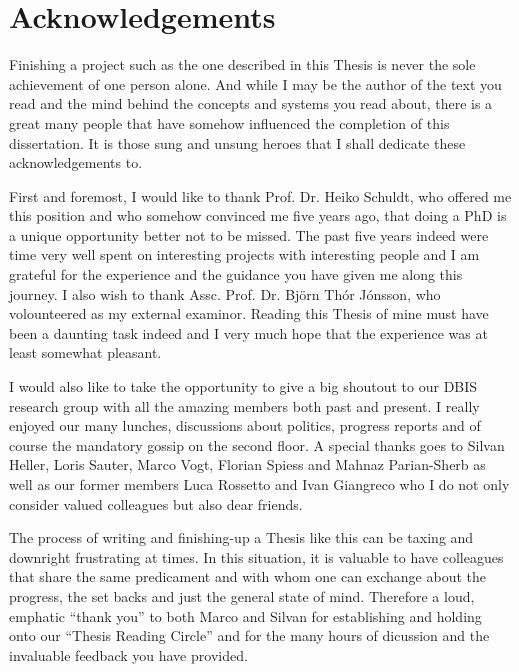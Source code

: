 
\chapter{Acknowledgements}

Finishing a project such as the one described in this Thesis is never the sole achievement of one person alone. And while I may be the author of the text you read and the mind behind the concepts and systems you read about, there is a great many people that have somehow influenced the completion of this dissertation. It is those sung and unsung heroes that I shall dedicate these acknowledgements to.

First and foremost, I would like to thank Prof. Dr. Heiko Schuldt, who offered me this position and who somehow convinced me five years ago, that doing a PhD is a unique opportunity better not to be missed. The past five years indeed were time very well spent on interesting projects with interesting people and I am grateful for the experience and the guidance you have given me along this journey. I also wish to thank Assc. Prof. Dr. Björn Thór Jónsson, who volounteered as my external examinor. Reading this Thesis of mine must have been a daunting task indeed and I very much hope that the experience was at least somewhat pleasant.

I would also like to take the opportunity to give a big shoutout to our DBIS research group with all the amazing members both past and present. I really enjoyed our many lunches, discussions about politics, progress reports and of course the mandatory gossip on the second floor. A special thanks goes to Silvan Heller, Loris Sauter, Marco Vogt, Florian Spiess and Mahnaz Parian-Sherb as well as our former members Luca Rossetto and Ivan Giangreco who I do not only consider valued colleagues but also dear friends.  

The process of writing and finishing-up a Thesis like this can be taxing and downright frustrating at times. In this situation, it is valuable to have colleagues that share the same predicament and with whom one can exchange about the progress, the set backs and just the general state of mind. Therefore a loud, emphatic ``thank you'' to both Marco and Silvan for establishing and holding onto our ``Thesis Reading Circle'' and for the many hours of dicussion and the invaluable feedback you have provided.

